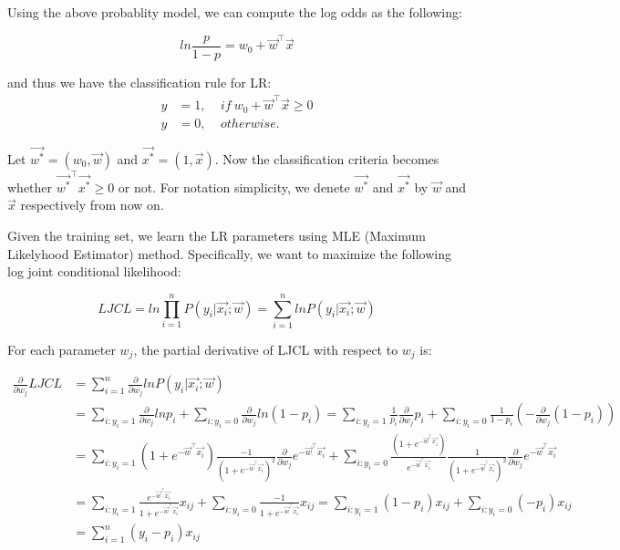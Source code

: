\documentclass{article} %
\begin{document}
Using the above probablity model, we can compute the log odds as the following:

\begin{equation}
  ln\frac{p}{1-p} = w_0 + \vec{w}^\top\vec{x}
\end{equation}

and thus we have the classification rule for LR:
\begin{align*}
  y &= 1, \ \ \ \ \ if \ w_0 + \vec{w}^\top\vec{x} \geq 0\\
  y &= 0, \ \ \ \ \ otherwise.
\end{align*}

Let $\vec{w^*} = (w_0, \vec{w})$ and $\vec{x^*} = (1, \vec{x})$. Now the classification criteria becomes whether $\vec{w^*}^\top\vec{x^*} \geq 0$ or not. For notation simplicity, we denete $\vec{w^*}$ and $\vec{x^*}$ by $\vec{w}$ and $\vec{x}$ respectively from now on.

Given the training set, we learn the LR parameters using MLE (Maximum Likelyhood Estimator) method. Specifically, we want to maximize the following log joint conditional likelihood:

\begin{equation}
  LJCL = ln\prod\limits_{i=1}^nP(y_i | \vec{x_i}; \vec{w}) = \sum\limits_{i=1}^nlnP(y_i | \vec{x_i}; \vec{w})
\end{equation}

For each parameter $w_j$, the partial derivative of LJCL with respect to $w_j$ is:

\begin{equation}
\begin{split}
  \frac{\partial}{\partial w_j} LJCL &= \sum\limits_{i=1}^n\frac{\partial}{\partial w_j}lnP(y_i | \vec{x_i}; \vec{w})\\
  &= \sum\limits_{i:y_i=1}\frac{\partial}{\partial w_j}lnp_i + \sum\limits_{i:y_i=0}\frac{\partial}{\partial w_j}ln(1-p_i) = \sum\limits_{i:y_i=1}\frac{1}{p_i}\frac{\partial}{\partial w_j}p_i + \sum\limits_{i:y_i=0}\frac{1}{1-p_i}(-\frac{\partial}{\partial w_j}(1-p_i))\\
  &= \sum\limits_{i:y_i=1}(1+e^{-\vec{w}^\top\vec{x_i}})\frac{-1}{(1+e^{-\vec{w}^\top\vec{x_i}})^2}\frac{\partial}{\partial w_j}e^{-\vec{w}^\top\vec{x_i}} + \sum\limits_{i:y_i=0}\frac{(1+e^{-\vec{w}^\top\vec{x_i}})}{e^{-\vec{w}^\top\vec{x_i}}}\frac{1}{(1+e^{-\vec{w}^\top\vec{x_i}})^2}\frac{\partial}{\partial w_j}e^{-\vec{w}^\top\vec{x_i}}\\
  &= \sum\limits_{i:y_i=1}\frac{e^{-\vec{w}^\top\vec{x_i}}}{1+e^{-\vec{w}^\top\vec{x_i}}}x_{ij} + \sum\limits_{i:y_i=0}\frac{-1}{1+e^{-\vec{w}^\top\vec{x_i}}}x_{ij} = \sum\limits_{i:y_i=1}(1-p_i)x_{ij} + \sum\limits_{i:y_i=0}(-p_i)x_{ij}\\
  &= \sum\limits_{i=1}^n(y_i-p_i)x_{ij}
\end{split}
\end{equation}
\end{document}
